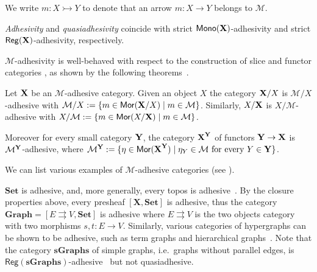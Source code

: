 \documentclass[runningheads,envcountsect]{llncs}
\newcommand{\cat}[1]{\ensuremath{\mathbf{#1}}}
\def\X{\textbf {\textup{X}}}
\def\Y{\textbf {\textup{Y}}}
\newcommand{\mor}{\mathsf{Mor}}
\newcommand{\mon}{\mathsf{Mono}}
\newcommand{\reg}{\mathsf{Reg}}
\begin{document}
We write $m\colon X\rightarrowtail Y$ to denote that an arrow $m\colon X\to Y$ belongs to $\mathcal{M}$.

\begin{remark}
	\label{rem:salva}
	\emph{Adhesivity} and \emph{quasiadhesivity} 
	\cite{lack2005adhesive,garner2012axioms} coincide with strict
	$\mon(\X) $-adhesivity and strict $\reg(\X)$-adhesivity,
	respectively.
\end{remark}


$\mathcal{M}$-adhesivity is well-behaved with respect to  the construction of slice and functor categories \cite{mac2013categories}, as shown by the following theorems~\cite{ehrig2006fundamentals,lack2005adhesive}.

\begin{theorem}
	\label{thm:slice-functors}
	Let $\X$ be an $\mathcal{M}$-adhesive category. Given an object $X$
	the category $\X/X$ is $\mathcal{M}/X$-adhesive with
	$\mathcal{M}/X:=\{m\in \mor(\X/X) \mid m\in
	\mathcal{M}\}$. Similarly, $X/\X$ is $X/\mathcal{M}$-adhesive with
	$X/\mathcal{M}:=\{m\in \mor(X/\X) \mid m\in \mathcal{M}\}$.
	
	Moreover for every small category $\Y$, the category $\X^\Y$ of
	functors $\Y\to \X$ is $\mathcal{M}^{\Y}$-adhesive, where
	$\mathcal{M}^{\Y}:=\{\eta \in \mor(\X^\Y) \mid \eta_Y \in
	\mathcal{M} \text{ for every } Y\in \Y\}$.
\end{theorem}

We can list various examples of $\mathcal{M}$-adhesive categories (see
\cite{castelnovo2023thesis,CastelnovoGM22,lack2006toposes}).


\begin{example}
	\label{ex:adhesive}
	$\cat{Set}$ is adhesive, and, more generally, every topos is
	adhesive~\cite{lack2006toposes}. By the closure properties above, every presheaf $[\cat{X},\cat{Set}]$ is adhesive, thus the category
	$\cat{Graph} = [ E \rightrightarrows V, \cat{Set}]$ is adhesive
	where $E \rightrightarrows {V}$ is the two objects category with two
	morphisms $s,t \colon{E} \to {V}$. Similarly, various
	categories of hypergraphs can be shown to be adhesive, such as term
	graphs and hierarchical graphs~\cite{CastelnovoGM24}. Note that the category $\cat{sGraphs}$ of simple graphs, 
	i.e.~graphs without parallel edges, is
	$\reg{(\cat{sGraphs})}$-adhesive~\cite{BehrHK23} but not
	quasiadhesive.
\end{example}


\iffalse 
\end{document}

